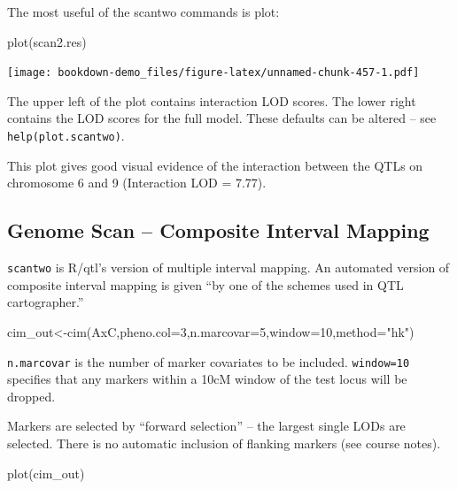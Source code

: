 \documentclass[
]{book}
\newenvironment{Shaded}{\begin{snugshade}}{\end{snugshade}}
\newcommand{\AttributeTok}[1]{\textcolor[rgb]{0.77,0.63,0.00}{#1}}
\newcommand{\DecValTok}[1]{\textcolor[rgb]{0.00,0.00,0.81}{#1}}
\newcommand{\FunctionTok}[1]{\textcolor[rgb]{0.00,0.00,0.00}{#1}}
\newcommand{\NormalTok}[1]{#1}
\newcommand{\OtherTok}[1]{\textcolor[rgb]{0.56,0.35,0.01}{#1}}
\newcommand{\StringTok}[1]{\textcolor[rgb]{0.31,0.60,0.02}{#1}}
\begin{document}
The most useful of the scantwo commands is plot:

\begin{Shaded}
\begin{Highlighting}[]
\FunctionTok{plot}\NormalTok{(scan2.res)}
\end{Highlighting}
\end{Shaded}

\texttt{[image: bookdown-demo\_files/figure-latex/unnamed-chunk-457-1.pdf]}

The upper left of the plot contains interaction LOD scores. The lower right contains the LOD scores for the full model. These defaults can be altered -- see \texttt{help(plot.scantwo)}.

This plot gives good visual evidence of the interaction between the QTLs on chromosome 6 and 9 (Interaction LOD = 7.77).

\hypertarget{genome-scan-composite-interval-mapping}{%
\subsection{Genome Scan -- Composite Interval Mapping}\label{genome-scan-composite-interval-mapping}}

\texttt{scantwo} is R/qtl's version of multiple interval mapping. An automated version of composite interval mapping is given ``by one of the schemes used in QTL cartographer.''

\begin{Shaded}
\begin{Highlighting}[]
\NormalTok{cim\_out}\OtherTok{\textless{}{-}}\FunctionTok{cim}\NormalTok{(AxC,}\AttributeTok{pheno.col=}\DecValTok{3}\NormalTok{,}\AttributeTok{n.marcovar=}\DecValTok{5}\NormalTok{,}\AttributeTok{window=}\DecValTok{10}\NormalTok{,}\AttributeTok{method=}\StringTok{"hk"}\NormalTok{) }
\end{Highlighting}
\end{Shaded}

\texttt{n.marcovar} is the number of marker covariates to be included. \texttt{window=10} specifies that any markers within a 10cM window of the test locus will be dropped.

Markers are selected by ``forward selection'' -- the largest single LODs are selected. There is no automatic inclusion of flanking markers (see course notes).

\begin{Shaded}
\begin{Highlighting}[]
\FunctionTok{plot}\NormalTok{(cim\_out) }
\end{Highlighting}
\end{Shaded}
\end{document}
